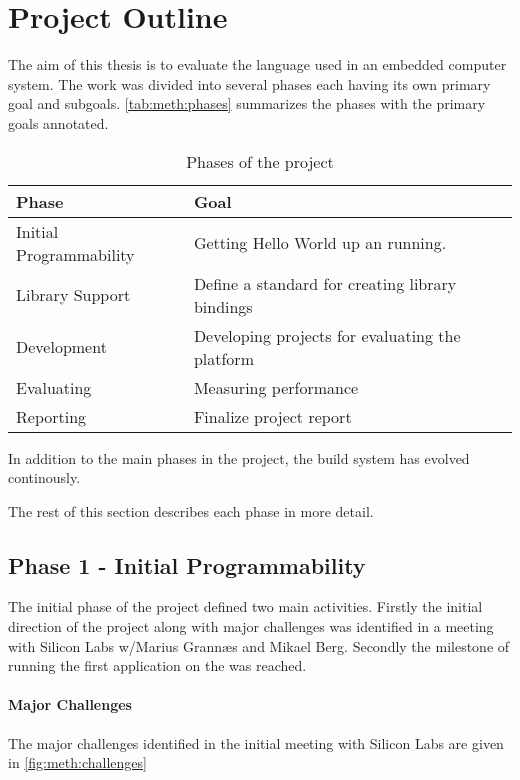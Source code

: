\section{Project Outline}
\label{sec:project-outline}

The aim of this thesis is to evaluate the {\rust} language used in an embedded computer system.
The work was divided into several phases each having its own primary goal and subgoals.
\autoref{tab:meth:phases} summarizes the phases with the primary goals annotated.

\begin{table}[H]
  \begin{center}
    \begin{tabular}{l|l}
      \textbf{Phase}&\textbf{Goal} \\
      \hline
      Initial Programmability & Getting Hello World up an running.\\
      Library Support & Define a standard for creating library bindings\\
      Development & Developing projects for evaluating the platform\\
      Evaluating & Measuring performance\\
      Reporting & Finalize project report\\
      \hline
    \end{tabular}
  \end{center}
  \caption{Phases of the project}
  \label{tab:meth:phases}
\end{table}

In addition to the main phases in the project, the build system has evolved continously.

The rest of this section describes each phase in more detail.

\subsection{Phase 1 - Initial Programmability}
The initial phase of the project defined two main activities.
Firstly the initial direction of the project along with major challenges was identified in a meeting with Silicon Labs w/Marius Grannæs and Mikael Berg.
Secondly the milestone of running the first {\rust} application on the {\gecko} was reached.

\paragraph{Major Challenges}
The major challenges identified in the initial meeting with Silicon Labs are given in \autoref{fig:meth:challenges}

